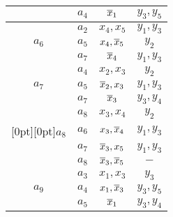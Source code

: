 \begin{table*}
\begin{center}
\begin{minipage}[t]{190pt}
\begin{tabular}{|c|c|c|c|}
 & $a_4$ & $\overline x_1$ & $y_3,y_5$ \\
\hline
  & $a_2$ & $x_4,x_5$ & $y_1,y_3$ \\
$a_6$ & $a_5$ & $x_4,\overline x_5$ & $y_2$ \\
 & $a_7$ & $\overline x_4$ & $y_1,y_3$ \\
\hline
  & $a_4$ & $x_2,x_3$ & $y_2$ \\
$a_7$ & $a_5$ & $\overline x_2,x_3$ & $y_1,y_3$ \\
 & $a_7$ & $\overline x_3$ & $y_3,y_4$ \\
\hline
 & $a_8$ & $x_3,x_4$ & $y_2$ \\
\multicolumn{1}{|c|}{\raisebox{-6pt}[0pt][0pt]{$a_8$}} & $a_6$ & $x_3,\overline x_4$ & $y_1,y_3$ \\
  & $a_7$ & $\overline x_3,x_5$ & $y_1,y_3$ \\
 & $a_8$ & $\overline x_3,\overline x_5$ & $-$ \\
\hline
  & $a_3$ & $x_1,x_3$ & $y_3$ \\
$a_9$ & $a_4$ & $x_1,\overline x_3$ & $y_3,y_5$ \\
 & $a_5$ & $\overline x_1$ & $y_3,y_4$ \\
\hline
\end{tabular}
\end{minipage}
\hspace*{17mm} 
\begin{minipage}[t]{190pt}
\vspace*{2ex}


\end{minipage}
\end{center}
\end{table*}
